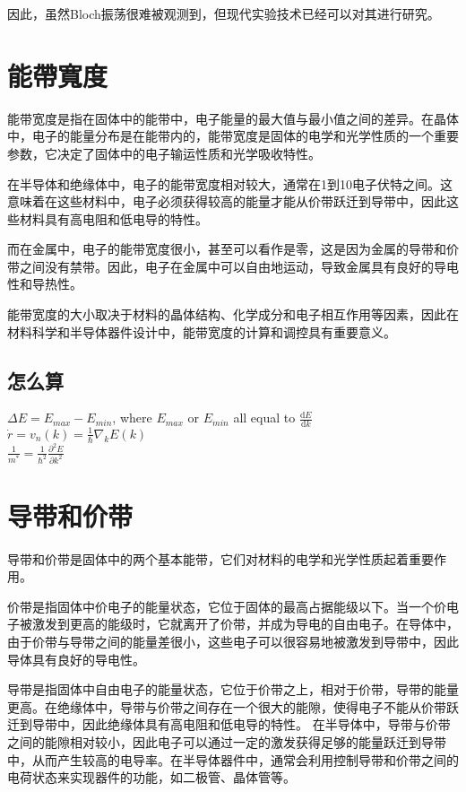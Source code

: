 \documentclass[12pt, a4paper, oneside]{ctexart}
\begin{document}
\begin{spacing}{2.0}
因此，虽然Bloch振荡很难被观测到，但现代实验技术已经可以对其进行研究。




\section{能帶寬度}
能带宽度是指在固体中的能带中，电子能量的最大值与最小值之间的差异。在晶体中，电子的能量分布是在能带内的，能带宽度是固体的电学和光学性质的一个重要参数，它决定了固体中的电子输运性质和光学吸收特性。

在半导体和绝缘体中，电子的能带宽度相对较大，通常在1到10电子伏特之间。这意味着在这些材料中，电子必须获得较高的能量才能从价带跃迁到导带中，因此这些材料具有高电阻和低电导的特性。

而在金属中，电子的能带宽度很小，甚至可以看作是零，这是因为金属的导带和价带之间没有禁带。因此，电子在金属中可以自由地运动，导致金属具有良好的导电性和导热性。

能带宽度的大小取决于材料的晶体结构、化学成分和电子相互作用等因素，因此在材料科学和半导体器件设计中，能带宽度的计算和调控具有重要意义。
\subsection{怎么算}
\begin{center}
    $\Delta E =E_{max}-E_{min}$, where $E_{max}$ or $E_{min}$ all equal to $\frac{\mathrm{d}E}{\mathrm{d}k}$\\
$\dot{r} = v_n(k) = \frac{1}{\hbar}\nabla_k E(k)$\\
$\frac{1}{m^*} = \frac{1}{\hbar^2} \frac{\partial^2 E}{\partial k^2}$
\end{center}


\section{导带和价带}
导带和价带是固体中的两个基本能带，它们对材料的电学和光学性质起着重要作用。

价带是指固体中价电子的能量状态，它位于固体的最高占据能级以下。当一个价电子被激发到更高的能级时，它就离开了价带，并成为导电的自由电子。在导体中，由于价带与导带之间的能量差很小，这些电子可以很容易地被激发到导带中，因此导体具有良好的导电性。

导带是指固体中自由电子的能量状态，它位于价带之上，相对于价带，导带的能量更高。在绝缘体中，导带与价带之间存在一个很大的能隙，使得电子不能从价带跃迁到导带中，因此绝缘体具有高电阻和低电导的特性。
在半导体中，导带与价带之间的能隙相对较小，因此电子可以通过一定的激发获得足够的能量跃迁到导带中，从而产生较高的电导率。在半导体器件中，通常会利用控制导带和价带之间的电荷状态来实现器件的功能，如二极管、晶体管等。


\end{spacing}
\end{document}
